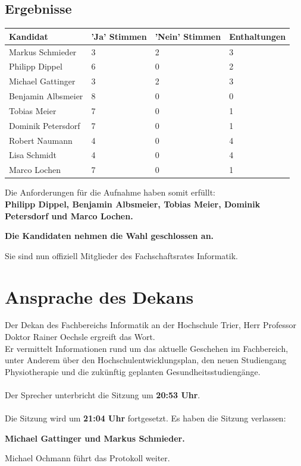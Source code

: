 \documentclass[a4paper, 11pt]{article} %
\begin{document}
\subsection{Ergebnisse}
\begin{tabular}{|l|l|l|l|}
	\hline
	\textbf{Kandidat} & \textbf{'Ja' Stimmen} & \textbf{'Nein' Stimmen} & \textbf{Enthaltungen}\\ \hline
	Markus Schmieder & 3 & 2 & 3\\ \hline
	Philipp Dippel & 6 & 0 & 2\\ \hline
	Michael Gattinger & 3 & 2 & 3\\ \hline
	Benjamin Albsmeier & 8 & 0 & 0\\ \hline
	Tobias Meier & 7 & 0 & 1\\ \hline
	Dominik Petersdorf & 7 & 0 & 1\\ \hline
	Robert Naumann & 4 & 0 & 4\\ \hline
	Lisa Schmidt & 4 & 0 & 4\\ \hline
	Marco Lochen & 7 & 0 & 1\\
	\hline
\end{tabular}
\vspace{0.5cm}
\begin{flushleft}
	Die Anforderungen für die Aufnahme haben somit erfüllt:\\
	\textbf{Philipp Dippel, Benjamin Albsmeier, Tobias Meier, Dominik Petersdorf und Marco Lochen.}
\end{flushleft}
\begin{center}
	\textbf{Die Kandidaten nehmen die Wahl geschlossen an.}
\end{center}
Sie sind nun offiziell Mitglieder des Fachschaftsrates Informatik.

\section{Ansprache des Dekans}
Der Dekan des Fachbereichs Informatik an der Hochschule Trier, Herr Professor Doktor Rainer Oechsle ergreift das Wort.\\
Er vermittelt Informationen rund um das aktuelle Geschehen im Fachbereich, unter Anderem über den Hochschulentwicklungsplan, den neuen Studiengang Physiotherapie und die zukünftig geplanten Gesundheitsstudiengänge.\\\\
Der Sprecher unterbricht die Sitzung um \textbf{20:53 Uhr}.\\\\
Die Sitzung wird um \textbf{21:04 Uhr} fortgesetzt. Es haben die Sitzung verlassen:
\begin{flushleft}
	\textbf{Michael Gattinger und Markus Schmieder.}
\end{flushleft}
Michael Ochmann führt das Protokoll weiter.
\end{document}
